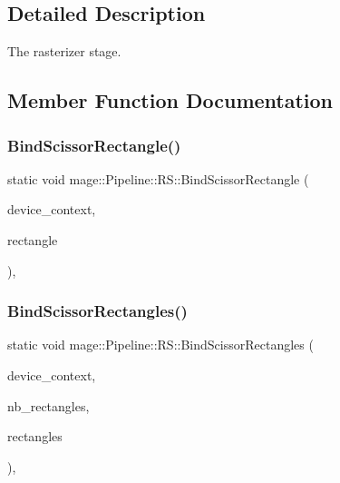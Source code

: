 \subsection{Detailed Description}
The rasterizer stage. 

\subsection{Member Function Documentation}
\hypertarget{structmage_1_1_pipeline_1_1_r_s_a2752b80ae52f33dae7c42b48b4481ec9}{}\label{structmage_1_1_pipeline_1_1_r_s_a2752b80ae52f33dae7c42b48b4481ec9} 
\subsubsection{\texorpdfstring{Bind\+Scissor\+Rectangle()}{BindScissorRectangle()}}
{\footnotesize\ttfamily static void mage\+::\+Pipeline\+::\+R\+S\+::\+Bind\+Scissor\+Rectangle (\begin{DoxyParamCaption}\item[{I\+D3\+D11\+Device\+Context4 $\ast$}]{device\+\_\+context,  }\item[{const D3\+D11\+\_\+\+R\+E\+CT $\ast$}]{rectangle }\end{DoxyParamCaption})\hspace{0.3cm}{\ttfamily [static]}, {\ttfamily [noexcept]}}

\hypertarget{structmage_1_1_pipeline_1_1_r_s_a11ee6c76dd0c05eecc0f09df7dc61068}{}\label{structmage_1_1_pipeline_1_1_r_s_a11ee6c76dd0c05eecc0f09df7dc61068} 
\subsubsection{\texorpdfstring{Bind\+Scissor\+Rectangles()}{BindScissorRectangles()}}
{\footnotesize\ttfamily static void mage\+::\+Pipeline\+::\+R\+S\+::\+Bind\+Scissor\+Rectangles (\begin{DoxyParamCaption}\item[{I\+D3\+D11\+Device\+Context4 $\ast$}]{device\+\_\+context,  }\item[{\hyperlink{namespacemage_a41c104c036fba3756a74e19f793eeaa1}{U32}}]{nb\+\_\+rectangles,  }\item[{const D3\+D11\+\_\+\+R\+E\+CT $\ast$}]{rectangles }\end{DoxyParamCaption})\hspace{0.3cm}{\ttfamily [static]}, {\ttfamily [noexcept]}}

